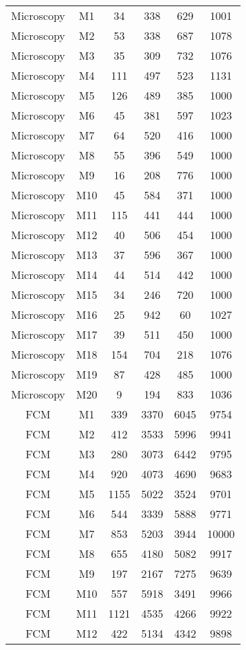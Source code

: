 \begin{center}
\begin{longtable}{cccccc}
\hline \hline
\endlastfoot	
Microscopy	&	M1	&	34	&	338	&	629	&	1001	\\
Microscopy	&	M2	&	53	&	338	&	687	&	1078	\\
Microscopy	&	M3	&	35	&	309	&	732	&	1076	\\
Microscopy	&	M4	&	111	&	497	&	523	&	1131	\\
Microscopy	&	M5	&	126	&	489	&	385	&	1000	\\
Microscopy	&	M6	&	45	&	381	&	597	&	1023	\\
Microscopy	&	M7	&	64	&	520	&	416	&	1000	\\
Microscopy	&	M8	&	55	&	396	&	549	&	1000	\\
Microscopy	&	M9	&	16	&	208	&	776	&	1000	\\
Microscopy	&	M10	&	45	&	584	&	371	&	1000	\\
Microscopy	&	M11	&	115	&	441	&	444	&	1000	\\
Microscopy	&	M12	&	40	&	506	&	454	&	1000	\\
Microscopy	&	M13	&	37	&	596	&	367	&	1000	\\
Microscopy	&	M14	&	44	&	514	&	442	&	1000	\\
Microscopy	&	M15	&	34	&	246	&	720	&	1000	\\
Microscopy	&	M16	&	25	&	942	&	60	&	1027	\\
Microscopy	&	M17	&	39	&	511	&	450	&	1000	\\
Microscopy	&	M18	&	154	&	704	&	218	&	1076	\\
Microscopy	&	M19	&	87	&	428	&	485	&	1000	\\
Microscopy	&	M20	&	9	&	194	&	833	&	1036	\\
FCM	&	M1	&	339	&	3370	&	6045	&	9754	\\
FCM	&	M2	&	412	&	3533	&	5996	&	9941	\\
FCM	&	M3	&	280	&	3073	&	6442	&	9795	\\
FCM	&	M4	&	920	&	4073	&	4690	&	9683	\\
FCM	&	M5	&	1155	&	5022	&	3524	&	9701	\\
FCM	&	M6	&	544	&	3339	&	5888	&	9771	\\
FCM	&	M7	&	853	&	5203	&	3944	&	10000	\\
FCM	&	M8	&	655	&	4180	&	5082	&	9917	\\
FCM	&	M9	&	197	&	2167	&	7275	&	9639	\\
FCM	&	M10	&	557	&	5918	&	3491	&	9966	\\
FCM	&	M11	&	1121	&	4535	&	4266	&	9922	\\
FCM	&	M12	&	422	&	5134	&	4342	&	9898	\\

\end{longtable}
\end{center}
